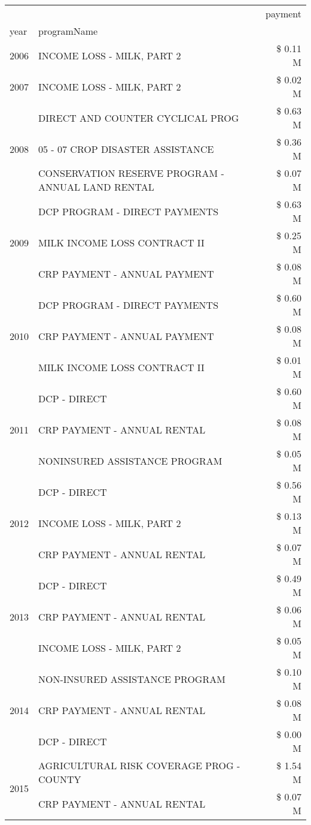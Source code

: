 \begin{tabular}{llr}
\toprule
 &  & payment \\
year & programName &  \\
\midrule
2006 & INCOME LOSS - MILK, PART 2 & \$ 0.11 M \\
\cline{1-3}
2007 & INCOME LOSS - MILK, PART 2 & \$ 0.02 M \\
\cline{1-3}
\multirow[t]{3}{*}{2008} & DIRECT AND COUNTER CYCLICAL PROG & \$ 0.63 M \\
 & 05 - 07 CROP DISASTER ASSISTANCE & \$ 0.36 M \\
 & CONSERVATION RESERVE PROGRAM - ANNUAL LAND RENTAL & \$ 0.07 M \\
\cline{1-3}
\multirow[t]{3}{*}{2009} & DCP PROGRAM - DIRECT PAYMENTS & \$ 0.63 M \\
 & MILK INCOME LOSS CONTRACT II & \$ 0.25 M \\
 & CRP PAYMENT - ANNUAL PAYMENT & \$ 0.08 M \\
\cline{1-3}
\multirow[t]{3}{*}{2010} & DCP PROGRAM - DIRECT PAYMENTS & \$ 0.60 M \\
 & CRP PAYMENT - ANNUAL PAYMENT & \$ 0.08 M \\
 & MILK INCOME LOSS CONTRACT II & \$ 0.01 M \\
\cline{1-3}
\multirow[t]{3}{*}{2011} & DCP - DIRECT & \$ 0.60 M \\
 & CRP PAYMENT - ANNUAL RENTAL & \$ 0.08 M \\
 & NONINSURED ASSISTANCE PROGRAM & \$ 0.05 M \\
\cline{1-3}
\multirow[t]{3}{*}{2012} & DCP - DIRECT & \$ 0.56 M \\
 & INCOME LOSS - MILK, PART 2 & \$ 0.13 M \\
 & CRP PAYMENT - ANNUAL RENTAL & \$ 0.07 M \\
\cline{1-3}
\multirow[t]{3}{*}{2013} & DCP - DIRECT & \$ 0.49 M \\
 & CRP PAYMENT - ANNUAL RENTAL & \$ 0.06 M \\
 & INCOME LOSS - MILK, PART 2 & \$ 0.05 M \\
\cline{1-3}
\multirow[t]{3}{*}{2014} & NON-INSURED ASSISTANCE PROGRAM & \$ 0.10 M \\
 & CRP PAYMENT - ANNUAL RENTAL & \$ 0.08 M \\
 & DCP - DIRECT & \$ 0.00 M \\
\cline{1-3}
\multirow[t]{3}{*}{2015} & AGRICULTURAL RISK COVERAGE PROG - COUNTY & \$ 1.54 M \\
 & CRP PAYMENT - ANNUAL RENTAL & \$ 0.07 M \\

\end{tabular}
